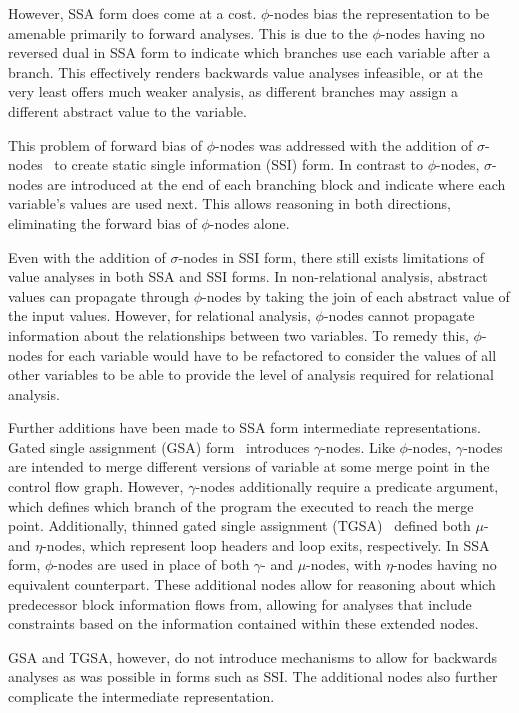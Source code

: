 However, SSA form does come at a cost. $\phi$-nodes bias the representation to be amenable primarily to forward analyses. This is due to the $\phi$-nodes having no reversed dual in SSA form to indicate which branches use each variable after a branch. This effectively renders backwards value analyses infeasible, or at the very least offers much weaker analysis, as different branches may assign a different abstract value to the variable. 

This problem of forward bias of $\phi$-nodes was addressed with the addition of $\sigma$-nodes~\cite{ananian2001static} to create static single information (SSI) form. In contrast to $\phi$-nodes, $\sigma$-nodes are introduced at the end of each branching block and indicate where each variable's values are used next. This allows reasoning in both directions, eliminating the forward bias of $\phi$-nodes alone.

Even with the addition of $\sigma$-nodes in SSI form, there still exists limitations of value analyses in both SSA and SSI forms. In non-relational analysis, abstract values can propagate through $\phi$-nodes by taking the join of each abstract value of the input values. However, for relational analysis, $\phi$-nodes cannot propagate information about the relationships between two variables. To remedy this, $\phi$-nodes for each variable would have to be refactored to consider the values of all other variables to be able to provide the level of analysis required for relational analysis.

Further additions have been made to SSA form intermediate representations. Gated single assignment (GSA) form~\cite{ottenstein1990program} introduces $\gamma$-nodes. Like $\phi$-nodes, $\gamma$-nodes are intended to merge different versions of variable at some merge point in the control flow graph. However, $\gamma$-nodes additionally require a predicate argument, which defines which branch of the program the executed to reach the merge point. Additionally, thinned gated single assignment (TGSA)~\cite{havlak1993construction} defined both $\mu$- and $\eta$-nodes, which represent loop headers and loop exits, respectively. In SSA form, $\phi$-nodes are used in place of both $\gamma$- and $\mu$-nodes, with $\eta$-nodes having no equivalent counterpart. These additional nodes allow for reasoning about which predecessor block information flows from, allowing for analyses that include constraints based on the information contained within these extended nodes. 

GSA and TGSA, however, do not introduce mechanisms to allow for backwards analyses as was possible in forms such as SSI. The additional nodes also further complicate the intermediate representation.

